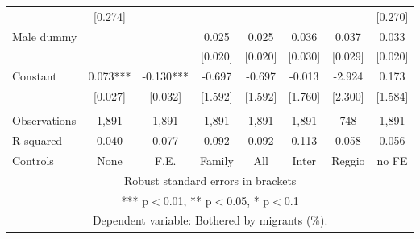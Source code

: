 \begin{tabular}{lccccccc}
 & [0.274] &  &  &  &  &  & [0.270] \\
Male dummy &  &  & 0.025 & 0.025 & 0.036 & 0.037 & 0.033 \\
 &  &  & [0.020] & [0.020] & [0.030] & [0.029] & [0.020] \\
Constant & 0.073*** & -0.130*** & -0.697 & -0.697 & -0.013 & -2.924 & 0.173 \\
 & [0.027] & [0.032] & [1.592] & [1.592] & [1.760] & [2.300] & [1.584] \\
 &  &  &  &  &  &  &  \\
Observations & 1,891 & 1,891 & 1,891 & 1,891 & 1,891 & 748 & 1,891 \\
R-squared & 0.040 & 0.077 & 0.092 & 0.092 & 0.113 & 0.058 & 0.056 \\
 Controls & None & F.E. & Family & All & Inter & Reggio & no FE \\ \hline
\multicolumn{8}{c}{ Robust standard errors in brackets} \\
\multicolumn{8}{c}{ *** p$<$0.01, ** p$<$0.05, * p$<$0.1} \\
\multicolumn{8}{c}{ Dependent variable: Bothered by migrants (\%).} \\
\end{tabular}
